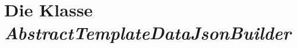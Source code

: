 \chapter{Die Klasse \emph{AbstractTemplateDataJsonBuilder}}
\label{app:quelltexte_abstract_template_data_json_builder}
\begin{footnotesize}

\end{footnotesize}